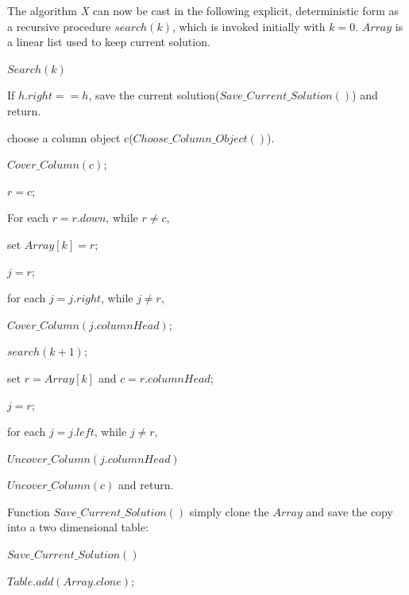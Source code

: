 \documentclass{mcmthesis}
\begin{document}
\indent The algorithm \textit{X} can now be cast in the following explicit, deterministic form as a recursive procedure $search(k)$, which is invoked initially with $k = 0$. $Array$ is a linear list used to keep current solution.\\
\begin{framed}
\begin{list}{.}
{\setlength{\parsep}{0ex}\setlength{\itemsep}{0ex}}
\item[] $Search(k)$
\item[] If $h.right == h$, save the current solution($Save\_Current\_Solution()$) and return.
\item[] choose a column object $c$($Choose \_Column\_Object()$).
\item[] $Cover\_Column(c)$;
\item[] $r = c$;
\item[] For each $r = r.down$, while $r \ne c$,
\item[] \qquad set $Array[k] = r$;
\item[] \qquad $j = r$;
\item[] \qquad for each $j = j.right$, while $j \ne r$,
\item[] \qquad\qquad $Cover\_Column(j.columnHead)$;
\item[] \qquad $search(k + 1)$;
\item[] \qquad set $r = Array[k]$ and $c = r.columnHead$;
\item[] \qquad $j = r$;
\item[] \qquad for each $j = j.left$, while $j \ne r$,
\item[] \qquad\qquad $Uncover\_Column(j.columnHead)$
\item[] $Uncover\_Column(c)$ and return.
\end{list}
\end{framed}

\indent Function $Save\_Current\_Solution()$ simply clone the $Array$ and save the copy into a two dimensional table:

\begin{framed}
\begin{list}{.}
{\setlength{\parsep}{0ex}\setlength{\itemsep}{0ex}}
\item[] $Save\_Current\_Solution()$
\item[] $Table.add(Array.clone)$;
\end{list}
\end{framed}
\end{document}
